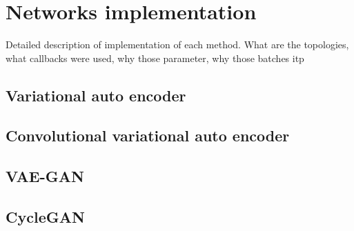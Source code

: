 \chapter{Networks implementation}
Detailed description of implementation of each method. What are the topologies, what callbacks were used, why those parameter, why those batches itp
\section{Variational auto encoder}
\section{Convolutional variational auto encoder}
\section{VAE-GAN}
\section{CycleGAN}